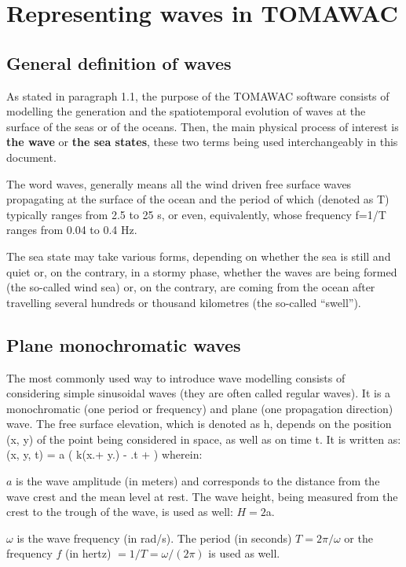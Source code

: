\chapter{  Representing waves in TOMAWAC }


\section{ General definition of waves}

 As stated in paragraph 1.1, the purpose of the TOMAWAC software consists of modelling the generation and the spatiotemporal evolution of waves at the surface of the seas or of the oceans. Then, the main physical process of interest is \textbf{the wave }or \textbf{the sea states}, these two terms being used interchangeably in this document.

 The word waves, generally means all the wind driven free surface waves propagating at the surface of the ocean and the period of which (denoted as T) typically ranges from 2.5 to 25 s, or even, equivalently, whose frequency f=1/T ranges from 0.04 to 0.4 Hz.

 The sea state may take various forms, depending on whether the sea is still and quiet or, on the contrary, in a stormy phase, whether the waves are being formed (the so-called wind sea) or, on the contrary, are coming from the ocean after travelling several hundreds or thousand kilometres (the so-called ``swell'').


\section{ Plane monochromatic waves}

 The most commonly used way to introduce wave modelling consists of considering simple sinusoidal waves (they are often called regular waves). It is a monochromatic (one period or frequency) and plane (one propagation direction) wave. The free surface elevation, which is denoted as h, depends on the position (x, y) of the point being considered in space, as well as on time t. It is written as:
\bequ
\label{eqmonochro}
\eta(x, y, t) = a \cos \left( k(x.\sin \theta + y.\cos \theta) - \omega.t + \phi \right) 
\eequ
 wherein:

 $a$ is the wave amplitude (in meters) and corresponds to the distance from the wave crest and the mean level at rest. The wave height, being measured from the crest to the trough of the wave, is used as well: $H=2$a.

 $\omega$ is the wave frequency (in rad/s). The period (in seconds) $T=2\pi/\omega$ or the frequency $f$ (in hertz) $= 1/T = \omega/(2\pi)$ is used as well.

